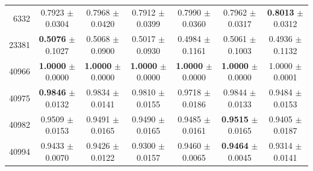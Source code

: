 \begin{table}[t]
\begin{tabular*}{\textwidth}{@{\extracolsep{\fill}}rcccccc@{}}
6332 & 0.7923 $\pm$ 0.0304 & 0.7968 $\pm$ 0.0420 & 0.7912 $\pm$ 0.0399 & 0.7990 $\pm$ 0.0360 & 0.7962 $\pm$ 0.0317 & \textbf{0.8013} $\pm$ 0.0312 \\
23381 & \textbf{0.5076} $\pm$ 0.1027 & 0.5068 $\pm$ 0.0900 & 0.5017 $\pm$ 0.0930 & 0.4984 $\pm$ 0.1161 & 0.5061 $\pm$ 0.1003 & 0.4936 $\pm$ 0.1132 \\
40966 & \textbf{1.0000} $\pm$ 0.0000 & \textbf{1.0000} $\pm$ 0.0000 & \textbf{1.0000} $\pm$ 0.0000 & \textbf{1.0000} $\pm$ 0.0000 & \textbf{1.0000} $\pm$ 0.0000 & 1.0000 $\pm$ 0.0001 \\
40975 & \textbf{0.9846} $\pm$ 0.0132 & 0.9834 $\pm$ 0.0141 & 0.9810 $\pm$ 0.0155 & 0.9718 $\pm$ 0.0186 & 0.9844 $\pm$ 0.0133 & 0.9484 $\pm$ 0.0153 \\
40982 & 0.9509 $\pm$ 0.0153 & 0.9491 $\pm$ 0.0165 & 0.9490 $\pm$ 0.0165 & 0.9485 $\pm$ 0.0161 & \textbf{0.9515} $\pm$ 0.0165 & 0.9405 $\pm$ 0.0187 \\
40994 & 0.9433 $\pm$ 0.0070 & 0.9426 $\pm$ 0.0122 & 0.9300 $\pm$ 0.0157 & 0.9460 $\pm$ 0.0065 & \textbf{0.9464} $\pm$ 0.0045 & 0.9314 $\pm$ 0.0141 \\
\bottomrule
\end{tabular*}
\label{tydra_AUROC}
\end{table}
